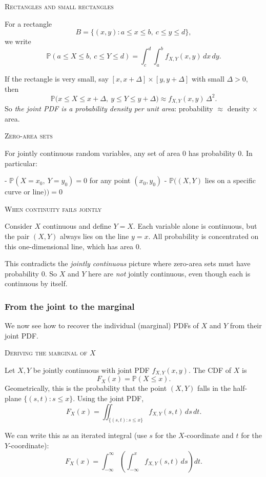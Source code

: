 \bigskip\textsc{Rectangles and small rectangles}

For a rectangle
\[
B = \{(x,y)\colon a \le x \le b,\ c \le y \le d\},
\]
we write
\[
\mathbb{P}(a \le X \le b,\ c \le Y \le d)
=
\int_c^{d}\int_a^{b} f_{X,Y}(x,y)\,dx\,dy.
\]

If the rectangle is very small, say \([x, x+\Delta]\times[y, y+\Delta]\) with small \(\Delta>0\), then
\[
\mathbb{P}\big(x \le X \le x+\Delta,\ y \le Y \le y+\Delta\big)
\approx
f_{X,Y}(x,y)\,\Delta^2.
\]
So \textit{the joint PDF is a probability density per unit area}: probability \(\approx\) density \(\times\) area.

\bigskip\textsc{Zero-area sets}

For jointly continuous random variables, any set of area \(0\) has probability \(0\).  
In particular:

- \(\mathbb{P}(X = x_0,\ Y = y_0) = 0\) for any point \((x_0,y_0)\)  
- \(\mathbb{P}\big( (X,Y)\) lies on a specific curve or line\()\big) = 0\)

\bigskip\textsc{When continuity fails jointly}

Consider \(X\) continuous and define \(Y=X\).  
Each variable alone is continuous, but the pair \((X,Y)\) always lies on the line \(y=x\).  
All probability is concentrated on this one-dimensional line, which has area \(0\).  

This contradicts the \textit{jointly continuous} picture where zero-area sets must have probability \(0\).  
So \(X\) and \(Y\) here are \textit{not} jointly continuous, even though each is continuous by itself.


\newpage
\subsubsection{From the joint to the marginal}

We now see how to recover the individual (marginal) PDFs of \(X\) and \(Y\) from their joint PDF.

\bigskip\textsc{Deriving the marginal of \(X\)}

Let \(X,Y\) be jointly continuous with joint PDF \(f_{X,Y}(x,y)\).  
The CDF of \(X\) is
\[
F_X(x) = \mathbb{P}(X \le x).
\]
Geometrically, this is the probability that the point \((X,Y)\) falls in the half-plane \(\{(s,t)\colon s \le x\}\).  
Using the joint PDF,
\[
F_X(x)
=
\iint_{\{(s,t)\colon s \le x\}} f_{X,Y}(s,t)\,ds\,dt.
\]

We can write this as an iterated integral (use \(s\) for the \(X\)-coordinate and \(t\) for the \(Y\)-coordinate):
\[
F_X(x)
=
\int_{-\infty}^{\infty}
\left(
\int_{-\infty}^{x} f_{X,Y}(s,t)\,ds
\right)dt.
\]

